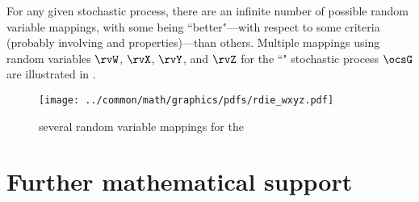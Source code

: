 For any given stochastic process, there are an infinite number of possible random variable mappings,
with some being ``better"---with respect to some criteria (probably involving 
and  properties)---than others. 
Multiple mappings using random variables $\rvW$, $\rvX$, $\rvY$, and $\rvZ$
for the ``" stochastic process $\ocsG$ are illustrated in .
\begin{figure}[h]
  \centering%
  \gsize%
  {\texttt{[image: ../common/math/graphics/pdfs/rdie\_wxyz.pdf]}}%
  \caption{several random variable mappings for the  \label{fig:intro_realdieXRYZ}}
\end{figure}


\section{Further mathematical support}


